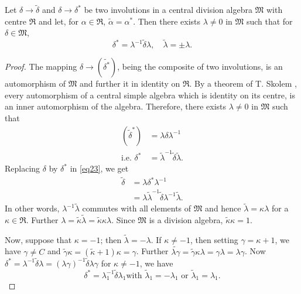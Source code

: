\begin{thm}\label{chap1:thm3}
Let $\delta \rightarrow \widetilde{\delta}$ and $\delta \rightarrow
\delta^{\ast}$ be two involutions in a central division algebra
$\mathfrak{M}$ with centre $\mathfrak{R}$ and let, for $\alpha \in
\mathfrak{R}$, $\widetilde{\alpha} = \alpha^{\ast}$. Then there exists
$\lambda \neq 0$ in $\mathfrak{M}$ such that for $\delta \in \mathfrak{M}$,
$$
\delta^{\ast} = \lambda^{-1} \widetilde{\delta}\lambda, \quad
\widetilde{\lambda} = \pm \lambda.
$$ \pageoriginale
\end{thm}

\begin{proof}
The mapping $\delta \rightarrow (\widetilde{\delta^{\ast}})$, being
the composite of two involutions, is an automorphism of $\mathfrak{M}$
and further it in identity on $\mathfrak{R}$. By a theorem of
T. Skolem \cite{23}, every automorphism of a central simple algebra
which is identity on its centre, is an inner automorphism of the
algebra. Therefore, there exists $\lambda\neq 0$ in $\mathfrak{M}$
such that
\begin{align*}
(\widetilde{\delta}^{\ast}) & = \lambda \delta \lambda^{-1} \tag{23}\label{eq23}\\
\text{i.e. } \delta^{\ast} & = \widetilde{\lambda}^{-1}
\widetilde{\delta} \widetilde{\lambda}.
\end{align*}
Replacing $\delta$ by $\delta^{\ast}$ in \eqref{eq23}, we get
\begin{align*}
\widetilde{\delta} & = \lambda \delta^{\ast} \lambda^{-1}\\
& = \lambda \widetilde{\lambda}^{-1} \widetilde{\delta} \lambda^{-1}
\widetilde{\lambda}. 
\end{align*}
In other words, $\lambda^{-1} \widetilde{\lambda}$ commutes with all
elements of $\mathfrak{M}$ and hence $\widetilde{\lambda} = \kappa
\lambda$ for a $\kappa \in \mathfrak{R}$. Further $\lambda =
\widetilde{\kappa} \widetilde{\lambda} = \widetilde{\kappa} \kappa
\lambda$. Since $\mathfrak{M}$ is a division algebra,
$\widetilde{\kappa} \kappa = 1$.

Now, suppose that $\kappa = -1$; then
$\widetilde{\lambda}=-\lambda$. If $\kappa \neq -1$, then setting
$\gamma = \kappa +1$, we have $\gamma \neq C$ and $\widetilde{\gamma}
\kappa = (\widetilde{\kappa}+1) \kappa = \gamma$. Further
$\widetilde{\lambda \gamma} = \widetilde{\gamma} \kappa \lambda = \gamma
\lambda = \lambda \gamma$. Now $\delta^{\ast} = \lambda^{-1}
\widetilde{\delta}\lambda = (\lambda \gamma)^{-1} \widetilde{\delta}
\lambda \gamma$ for $\kappa \neq -1$, we have
$$
\delta^{\ast} = \lambda^{-1}_1 \widetilde{\delta} \lambda_1 \text{
  with } \widetilde{\lambda}_1 = - \lambda_1 \text{ or }
\widetilde{\lambda}_1 = \lambda_1.
$$


\end{proof}
